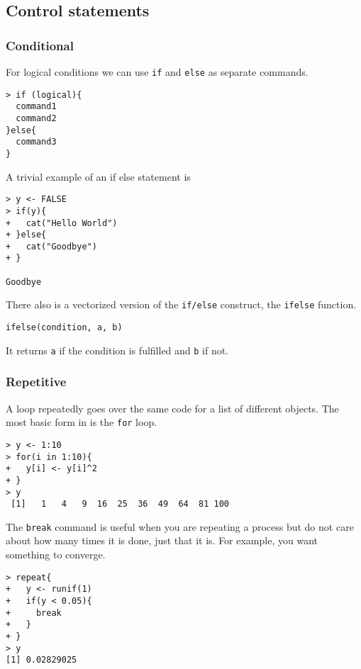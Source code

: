 \subsection{Control statements}

\subsubsection*{Conditional}

For logical conditions we can use \texttt{if} and \texttt{else} as separate commands.

\begin{lstlisting}
> if (logical){
  command1
  command2
}else{
  command3
}
\end{lstlisting}

A trivial example of an if else statement is

\begin{lstlisting}
> y <- FALSE
> if(y){
+   cat("Hello World")
+ }else{
+   cat("Goodbye")
+ }

Goodbye
\end{lstlisting}

There also is a vectorized version of the \texttt{if/else} construct, the \texttt{ifelse} function.

\begin{lstlisting}
ifelse(condition, a, b)
\end{lstlisting}

It returns \texttt{a} if the condition is fulfilled and \texttt{b} if not.

\subsubsection*{Repetitive}

A loop repeatedly goes over the same code for a list of different objects. The most basic form in \R is the \texttt{for} loop.

\begin{lstlisting}
> y <- 1:10
> for(i in 1:10){
+   y[i] <- y[i]^2
+ }
> y
 [1]   1   4   9  16  25  36  49  64  81 100
\end{lstlisting}

The \texttt{break} command is useful when you are repeating a process but do not care about how many times it is done, just that it is. For example, you want something to converge.

\begin{lstlisting}
> repeat{
+   y <- runif(1)
+   if(y < 0.05){
+     break
+   }
+ }
> y
[1] 0.02829025
\end{lstlisting}

